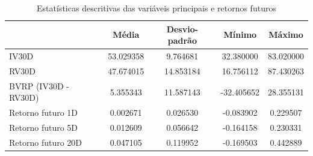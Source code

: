 \begin{table}
\caption{Estatísticas descritivas das variáveis principais e retornos futuros}
\label{tab:estatisticas_cap4}
\begin{tabular}{lcccc}
\toprule
 & Média & Desvio-padrão & Mínimo & Máximo \\
\midrule
IV30D & 53.029358 & 9.764681 & 32.380000 & 83.020000 \\
RV30D & 47.674015 & 14.853184 & 16.756112 & 87.430263 \\
BVRP (IV30D - RV30D) & 5.355343 & 11.587143 & -32.405652 & 28.355131 \\
Retorno futuro 1D & 0.002671 & 0.026530 & -0.083902 & 0.229507 \\
Retorno futuro 5D & 0.012609 & 0.056642 & -0.164158 & 0.230331 \\
Retorno futuro 20D & 0.047105 & 0.119952 & -0.169503 & 0.442889 \\
\bottomrule
\end{tabular}
\end{table}
